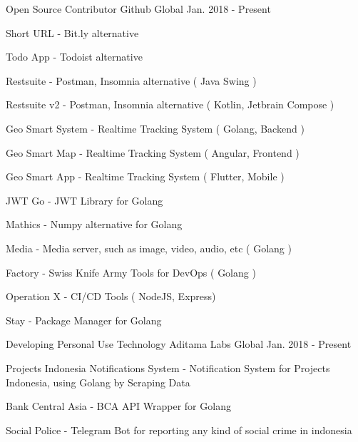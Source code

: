 

\begin{cventries}
  \cventry
    {Open Source Contributor} %
    {Github} %
    {Global} %
    {Jan. 2018 - Present} %
    {
      \begin{cvitems} %
        \item {Short URL - Bit.ly alternative}
        \item {Todo App - Todoist alternative}
        \item {Restsuite - Postman, Insomnia alternative ( Java Swing ) }
        \item {Restsuite v2 - Postman, Insomnia alternative ( Kotlin, Jetbrain Compose ) }
        \item {Geo Smart System - Realtime Tracking System ( Golang, Backend ) }
        \item {Geo Smart Map - Realtime Tracking System ( Angular, Frontend ) }
        \item {Geo Smart App - Realtime Tracking System ( Flutter, Mobile ) }
        \item {JWT Go - JWT Library for Golang }
        \item {Mathics - Numpy alternative for Golang }
        \item {Media - Media server, such as image, video, audio, etc ( Golang ) }
        \item {Factory - Swiss Knife Army Tools for DevOps ( Golang ) }
        \item {Operation X - CI/CD Tools ( NodeJS, Express) }
        \item {Stay - Package Manager for Golang }
      \end{cvitems}
    }
  \cventry
  {Developing Personal Use Technology} %
  {Aditama Labs} %
  {Global} %
  {Jan. 2018 - Present} %
  {
    \begin{cvitems} %
      \item {Projects Indonesia Notifications System - Notification System for Projects Indonesia, using Golang by Scraping Data }
      \item {Bank Central Asia - BCA API Wrapper for Golang }
      \item {Social Police - Telegram Bot for reporting any kind of social crime in indonesia }
    \end{cvitems}
  }


\end{cventries}
